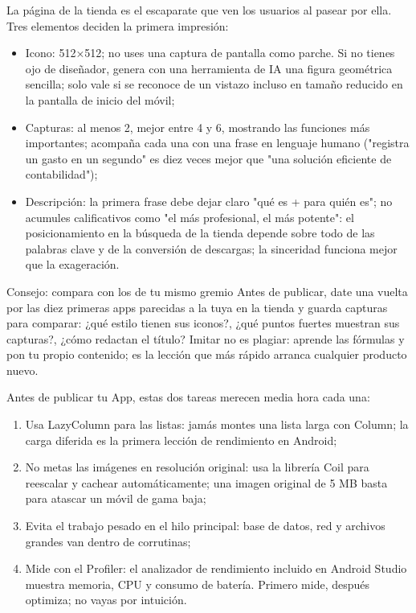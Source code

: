 
La página de la tienda es el escaparate que ven los usuarios al pasear por ella. Tres elementos deciden la primera impresión:

\begin{itemize}
  \item Icono: 512×512; no uses una captura de pantalla como parche. Si no tienes ojo de diseñador, genera con una herramienta de IA una figura geométrica sencilla; solo vale si se reconoce de un vistazo incluso en tamaño reducido en la pantalla de inicio del móvil;
  \item Capturas: al menos 2, mejor entre 4 y 6, mostrando las funciones más importantes; acompaña cada una con una frase en lenguaje humano ("registra un gasto en un segundo" es diez veces mejor que "una solución eficiente de contabilidad");
  \item Descripción: la primera frase debe dejar claro "qué es + para quién es"; no acumules calificativos como "el más profesional, el más potente": el posicionamiento en la búsqueda de la tienda depende sobre todo de las palabras clave y de la conversión de descargas; la sinceridad funciona mejor que la exageración.
\end{itemize}

\begin{tcbinfo}{Consejo: compara con los de tu mismo gremio}
Antes de publicar, date una vuelta por las diez primeras apps parecidas a la tuya en la tienda y guarda capturas para comparar: ¿qué estilo tienen sus iconos?, ¿qué puntos fuertes muestran sus capturas?, ¿cómo redactan el título? Imitar no es plagiar: aprende las fórmulas y pon tu propio contenido; es la lección que más rápido arranca cualquier producto nuevo.

\end{tcbinfo}


Antes de publicar tu App, estas dos tareas merecen media hora cada una:


\begin{enumerate}
  \item Usa LazyColumn para las listas: jamás montes una lista larga con Column; la carga diferida es la primera lección de rendimiento en Android;
  \item No metas las imágenes en resolución original: usa la librería Coil para reescalar y cachear automáticamente; una imagen original de 5 MB basta para atascar un móvil de gama baja;
  \item Evita el trabajo pesado en el hilo principal: base de datos, red y archivos grandes van dentro de corrutinas;
  \item Mide con el Profiler: el analizador de rendimiento incluido en Android Studio muestra memoria, CPU y consumo de batería. Primero mide, después optimiza; no vayas por intuición.
\end{enumerate}

